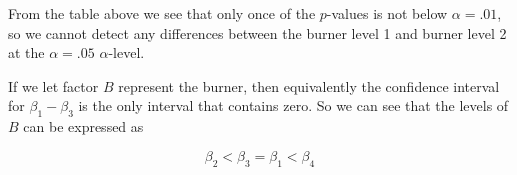 \documentclass[12pt,]{article}
\begin{document}
From the table above we see that only once of the \(p\)-values is not
below \(\alpha = .01\), so we cannot detect any differences between the
burner level 1 and burner level 2 at the \(\alpha=.05\)
\(\alpha\)-level.

If we let factor \(B\) represent the burner, then equivalently the
confidence interval for \(\beta_1 - \beta_3\) is the only interval that
contains zero. So we can see that the levels of \(B\) can be expressed
as

\[
\beta_2 < \beta_3 = \beta_1 < \beta_4
\]
\end{document}

